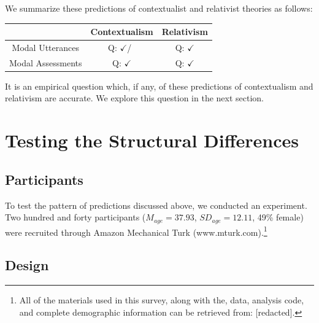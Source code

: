 \documentclass[11pt]{article}
\newcommand{\xmark}{\ding{55}}
\begin{document}
\begin{doublespace}
We summarize these predictions of contextualist and relativist theories as follows:
\begin{table}[h]
\begin{center}
\begin{tabular}{c|c|c}
			& Contextualism	& Relativism \\
			\hline
Modal Utterances  & Q: $\checkmark$/\ \xmark & Q: $\checkmark$ \\
Modal Assessments		& Q: $\checkmark$			& Q: $\checkmark$
\end{tabular}
\end{center}
\end{table}

\noindent It is an empirical question which, if any, of these predictions of contextualism and relativism are accurate. We explore this question in the next section.%


\section{Testing the Structural Differences}
\label{2}

\subsection{Participants}
\label{2.1}

To test the pattern of predictions discussed above, we conducted an experiment. Two hundred and forty participants ($M_{age} = 37.93$, $SD_{age} = 12.11$, 49\% female) were recruited through Amazon Mechanical Turk (www.mturk.com).\footnote{All of the materials used in this survey, along with the, data, analysis code, and complete demographic information can be retrieved from: [redacted].}

\subsection{Design}
\label{2.2}


\end{doublespace}
\end{document}
